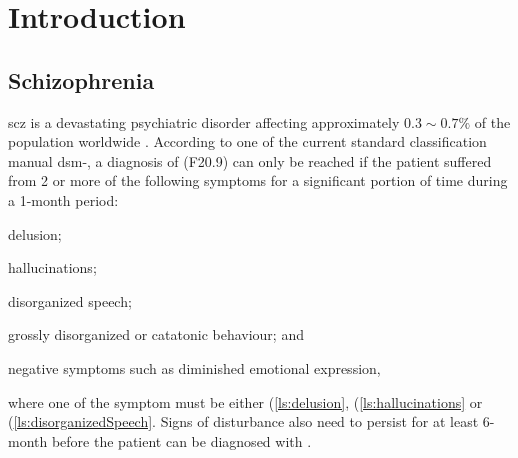 	\chapter{Introduction}
	\section{Schizophrenia}
	\Gls{scz} is a devastating psychiatric disorder affecting approximately $0.3\sim0.7\%$ of the population  worldwide \citep{AmericanPsychiatricAssociation2013}.
	According to one of the current standard classification manual \gls{dsm}-, a diagnosis of  (F20.9) can only be reached if the patient suffered from 2 or more of the following symptoms for a significant portion of time during a 1-month period: 
	\begin{enumerate*}[label=\arabic*\upshape)]
		\item delusion; \label{ls:delusion}
		\item hallucinations;\label{ls:hallucinations}
		\item disorganized speech;\label{ls:disorganizedSpeech}
		\item grossly disorganized or catatonic behaviour; and\label{ls:catatonicBehavior}
		\item negative symptoms such as diminished emotional expression,\label{ls:negativeSymptoms}
	\end{enumerate*}  where one of the symptom must be either (\ref{ls:delusion}, (\ref{ls:hallucinations} or (\ref{ls:disorganizedSpeech}.
	Signs of disturbance also need to persist for at least 6-month before the patient can be diagnosed with .
	
